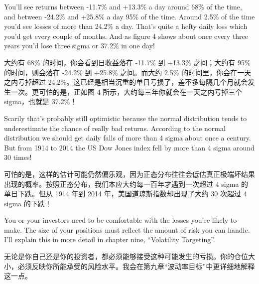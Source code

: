 \begin{englishblock} You'll see returns between -11.7\% and +13.3\% a day around 68\% of the time, and between -24.2\% and +25.8\% a day 95\% of the time. Around 2.5\% of the time you'd see losses of more than 24.2\% a day. That's quite a hefty daily loss which you'd get every couple of months. And as figure 4 shows about once every three years you'd lose three sigma or 37.2\% in one day! \end{englishblock}

\begin{chineseblock}大约有 68\% 的时间，你会看到日收益落在 -11.7\% 到 +13.3\% 之间；大约有 95\% 的时间，则会落在 -24.2\% 到 +25.8\% 之间。而大约 2.5\% 的时间里，你会在一天之内亏掉超过 24.2\%。这已经是相当沉重的单日亏损了，差不多每隔几个月就会发生一次。更可怕的是，正如图 4 所示，大约每三年你就会在一天之内亏掉三个 sigma，也就是 37.2\%！ \end{chineseblock}

\bipairgap

\begin{englishblock} Scarily that's probably still optimistic because the normal distribution tends to underestimate the chance of really bad returns. According to the normal distribution we should get daily falls of more than 4 sigma about once a century. But from 1914 to 2014 the US Dow Jones index fell by more than 4 sigma around 30 times! \end{englishblock}

\begin{chineseblock}可怕的是，这样的估计可能仍然偏乐观，因为正态分布往往会低估真正极端坏结果出现的概率。按照正态分布，我们本应大约每一百年才遇到一次超过 4 sigma 的单日下跌。但从 1914 年到 2014 年，美国道琼斯指数却出现了大约 30 次超过 4 sigma 的下跌！\end{chineseblock}

\bipairgap

\begin{englishblock} You or your investors need to be comfortable with the losses you're likely to make. The size of your positions must reflect the amount of risk you can handle. I'll explain this in more detail in chapter nine, ``Volatility Targeting''. \end{englishblock}

\begin{chineseblock}无论是你自己还是你的投资者，都必须能够接受这种可能发生的亏损。你的仓位大小，必须反映你所能承受的风险水平。我会在第九章“波动率目标”中更详细地解释这一点。\end{chineseblock}
